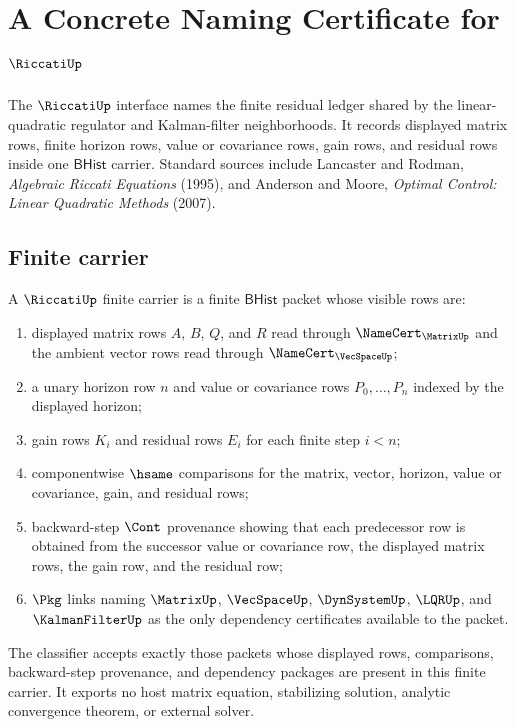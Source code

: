 \chapter{A Concrete Naming Certificate for $\RiccatiUp$}
\label{ch:concrete-instances-riccati-namecert}

The $\RiccatiUp$ interface names the finite residual ledger shared by the linear-quadratic regulator and Kalman-filter neighborhoods. It records displayed matrix rows, finite horizon rows, value or covariance rows, gain rows, and residual rows inside one $\mathsf{BHist}$ carrier. Standard sources include Lancaster and Rodman, \emph{Algebraic Riccati Equations} (1995), and Anderson and Moore, \emph{Optimal Control: Linear Quadratic Methods} (2007).

\section{Finite carrier}
\label{sec:riccatiup-finite-carrier}

\begin{definition}
\label{def:riccatiup-finite-bhist-carrier}
A $\RiccatiUp$ finite carrier is a finite $\mathsf{BHist}$ packet whose visible rows are:
\begin{enumerate}
\item displayed matrix rows $A$, $B$, $Q$, and $R$ read through $\NameCert_{\MatrixUp}$ and the ambient vector rows read through $\NameCert_{\VecSpaceUp}$;
\item a unary horizon row $n$ and value or covariance rows $P_0,\ldots,P_n$ indexed by the displayed horizon;
\item gain rows $K_i$ and residual rows $E_i$ for each finite step $i<n$;
\item componentwise $\hsame$ comparisons for the matrix, vector, horizon, value or covariance, gain, and residual rows;
\item backward-step $\Cont$ provenance showing that each predecessor row is obtained from the successor value or covariance row, the displayed matrix rows, the gain row, and the residual row;
\item $\Pkg$ links naming $\MatrixUp$, $\VecSpaceUp$, $\DynSystemUp$, $\LQRUp$, and $\KalmanFilterUp$ as the only dependency certificates available to the packet.
\end{enumerate}
The classifier accepts exactly those packets whose displayed rows, comparisons, backward-step provenance, and dependency packages are present in this finite carrier. It exports no host matrix equation, stabilizing solution, analytic convergence theorem, or external solver.
\end{definition}

